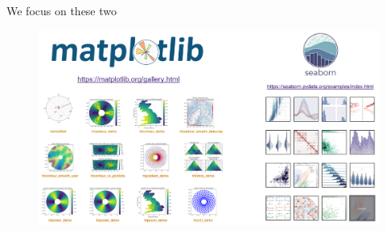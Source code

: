 \documentclass[aspectratio=169]{../latex_main/tntbeamer}  %
\begin{document}
	
	\begin{frame}{We focus on these two}
	    \begin{figure}
	        \centering
	        \includegraphics[scale=.3]{Bild25}
	    \end{figure}
	\end{frame}
	
\end{document}
